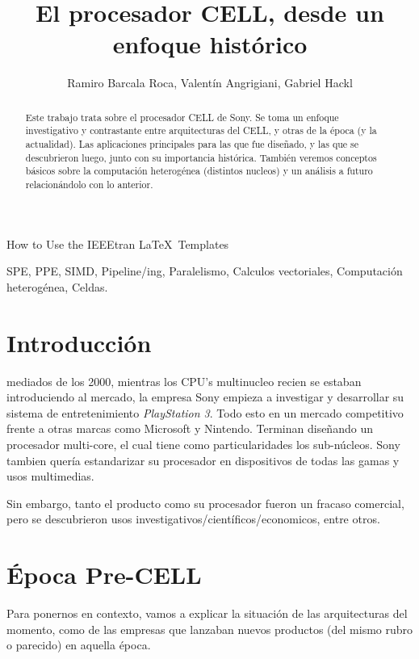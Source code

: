 \documentclass[10pt,compsoc]{IEEEtran}
\begin{document}
	\title{El procesador CELL, desde un enfoque
		histórico}
	\author{Ramiro Barcala Roca, Valentín Angrigiani, Gabriel Hackl}
		
	{How to Use the IEEEtran \LaTeX \ Templates}
	\maketitle
	
	\begin{abstract}
		Este trabajo trata sobre el procesador CELL de Sony. Se toma un enfoque investigativo y contrastante entre arquitecturas del CELL, y otras de la época (y la actualidad). Las aplicaciones principales para las que fue diseñado, y las que se descubrieron luego, junto con su importancia histórica. También veremos conceptos básicos sobre la computación heterogénea (distintos nucleos) y un análisis a futuro relacionándolo con lo anterior.
	\end{abstract}
	
	\begin{IEEEkeywords}
		SPE, PPE, SIMD, Pipeline/ing, Paralelismo, Calculos vectoriales, Computación heterogénea, Celdas.
	\end{IEEEkeywords}
	
	\section{Introducción}
	 mediados de los 2000, mientras los CPU's multinucleo recien se estaban introduciendo al mercado, la empresa Sony empieza a investigar y desarrollar su sistema de entretenimiento \textit{PlayStation 3}. Todo esto en un mercado competitivo frente a otras marcas como Microsoft y Nintendo. Terminan diseñando un procesador multi-core, el cual tiene como particularidades los sub-núcleos. Sony tambien quería estandarizar su procesador en dispositivos de todas las gamas y usos multimedias.
	
	Sin embargo, tanto el producto como su procesador fueron un fracaso comercial, pero se descubrieron usos investigativos/científicos/economicos, entre otros.
	
	
	\section{Época Pre-CELL}
	\noindent Para ponernos en contexto, vamos a explicar la situación de las arquitecturas del momento, como de las empresas que lanzaban nuevos productos (del mismo rubro o parecido) en aquella época.
	
\end{document}
